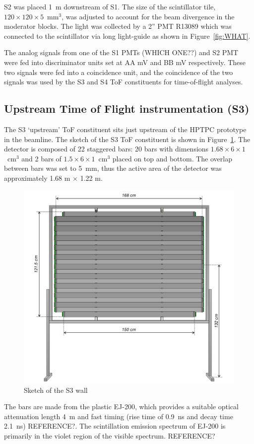 	S2 was placed 1~m downstream of S1. The size of the scintillator tile, $120\times120\times5$~mm$^3$, was adjusted to account for the beam divergence in the moderator blocks. The light was collected by a 2'' PMT R13089 which was connected to the scintillator via long light-guide as shown in Figure~\ref{fig:WHAT}. 
	
	The analog signals from one of the S1 PMTs (WHICH ONE??) and S2 PMT were fed into discriminator units set at AA mV and BB mV respectively. These two signals were fed into a coincidence unit, and the coincidence of the two signals was used by the S3 and S4 ToF constituents for time-of-flight analyses. 

    
\subsection{Upstream Time of Flight instrumentation (S3)}

The S3 `upstream' ToF constituent sits just upstream of the HPTPC prototype in the beamline. The sketch of the S3 ToF constituent is shown in Figure~\ref{fig:S3sketch}. The detector is composed of 22 staggered bars:  20 bars with dimensions $1.68 \times 6 \times 1$~cm$^3$ and 2 bars of  $1.5 \times 6 \times 1$~cm$^3$ placed on top and bottom.
The overlap between bars was set to 5~mm, thus the active area of the detector was approximately 1.68 m $\times$ 1.22 m.
     \begin{figure}
      \centering
    \includegraphics[width=0.7\linewidth]{files/Figures/uToF_sketch.pdf}
    	\caption{Sketch of the S3 wall}
    		\label{fig:S3sketch}
    \end{figure}
    
The bars are made from the plastic EJ-200, which provides a suitable optical attenuation length 4~m and fast timing (rise time of 0.9~ns and decay time 2.1~ns) REFERENCE?. The scintillation emission spectrum of EJ-200 is primarily in the violet region of the visible spectrum. REFERENCE?

